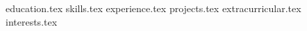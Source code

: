 \documentclass[11pt, a4paper]{awesome-cv}
\newcommand*{\sectiondir}{resume/}
\begin{document}
\makecvheader

{education.tex}
{skills.tex}
{experience.tex}
{projects.tex}
{extracurricular.tex}
{interests.tex}
\end{document}

